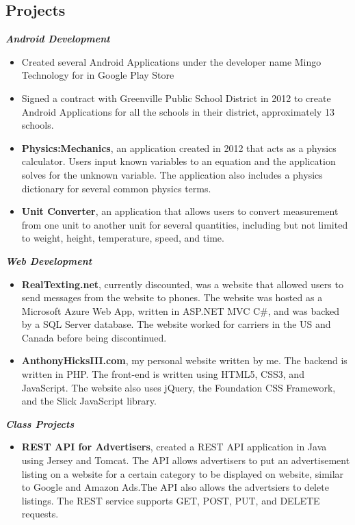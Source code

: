 \documentclass[10pt]{res}
\begin{document}
\begin{resume}
\section{Projects}
\textbf{\textit{Android Development}}
	\begin{itemize}
		\item Created several Android Applications under the developer name Mingo Technology for in Google Play Store
		\item Signed a contract with Greenville Public School District in 2012 to create Android Applications for all the schools in their district, approximately 13 schools. 
		\item \textbf{Physics:Mechanics}, an application created in 2012 that acts as a physics calculator. Users input known variables to an equation and the application solves for the unknown variable. The application also includes a physics dictionary for several common physics terms. 
		\item \textbf{Unit Converter}, an application that allows users to convert measurement from one unit to another unit for several quantities, including but not limited to weight, height, temperature, speed, and time. 
	\end{itemize} 
\textbf{\textit{Web Development}}
	\begin{itemize}
		\item \textbf{RealTexting.net}, currently discounted, was a website that allowed users to send messages from the website to phones. The website was hosted as a Microsoft Azure Web App, written in ASP.NET MVC C\#, and was backed by a SQL Server database. The website worked for carriers in the US and Canada before being discontinued. 
		\item \textbf{AnthonyHicksIII.com}, my personal website written by me. The backend is written in PHP. The front-end is written using HTML5, CSS3, and JavaScript. The website also uses jQuery, the Foundation CSS Framework, and the Slick JavaScript library.
	\end{itemize}
\textbf{\textit{Class Projects}}
	\begin{itemize}
		\item \textbf{REST API for Advertisers}, created a REST API application in Java using Jersey and Tomcat. The API allows advertisers to put an advertisement listing on a website for a certain category to be displayed on website, similar to Google and Amazon Ads.The API also allows the advertsiers to delete listings. The REST service supports GET, POST, PUT, and DELETE requests.  
	\end{itemize} 


\end{resume}
\end{document}
